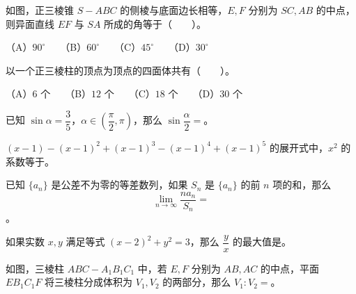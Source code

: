 \begin{question}
如图，正三棱锥 $S-ABC$ 的侧棱与底面边长相等，$E,F$ 分别为 $SC,AB$ 的中点，则异面直线 $EF$ 与 $SA$ 所成的角等于\mbox{（　　）}。
\nopagebreak[4]
\begin{center}\end{center}
\nopagebreak[4]
（A）$90^\circ$　　（B）$60^\circ$　　（C）$45^\circ$　　（D）$30^\circ$

\end{question}
\begin{question}
以一个正三棱柱的顶点为顶点的四面体共有\mbox{（　　）}。

（A）$6$ 个　　（B）$12$ 个　　（C）$18$ 个　　（D）$30$ 个

\end{question}

\begin{question}
已知 $\sin\alpha=\dfrac35$，$\alpha\in\left(\dfrac\pi2,\pi\right)$，那么 $\sin\dfrac\alpha2=$\gkblank{}。

\end{question}
\begin{question}
$(x-1)-(x-1)^2+(x-1)^3-(x-1)^4+(x-1)^5$ 的展开式中，$x^2$ 的系数等于\gkblank{}。

\end{question}
\begin{question}
已知 $\{a_n\}$ 是公差不为零的等差数列，如果 $S_n$ 是 $\{a_n\}$ 的前 $n$ 项的和，那么
\nopagebreak[4]
\[
\lim_{n\to\infty}\frac{na_n}{S_n}=
\]
\gkblank{}。

\end{question}
\begin{question}
如果实数 $x,y$ 满足等式 $(x-2)^2+y^2=3$，那么 $\dfrac yx$ 的最大值是\gkblank{}。

\Needspace{0.4\textheight}
\end{question}
\begin{question}
如图，三棱柱 $ABC-A_1B_1C_1$ 中，若 $E,F$ 分别为 $AB,AC$ 的中点，平面 $EB_1C_1F$ 将三棱柱分成体积为 $V_1,V_2$ 的两部分，那么 $V_1:V_2=$\gkblank{}。
\nopagebreak[4]
\begin{center}\end{center}
\nopagebreak[4]
\end{question}

